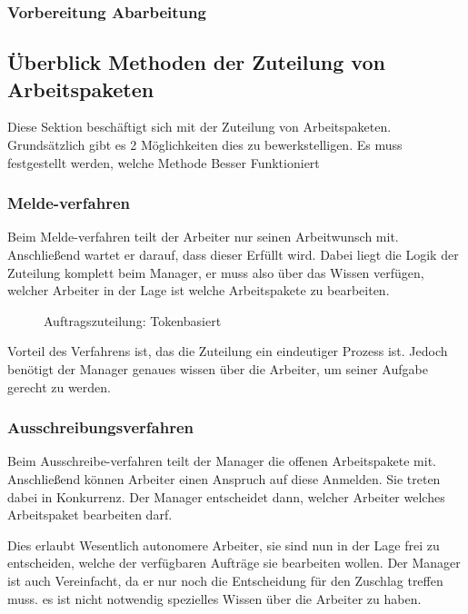 \subsubsection{Vorbereitung Abarbeitung}

\subsection{Überblick Methoden der Zuteilung von Arbeitspaketen}

Diese Sektion beschäftigt sich mit der Zuteilung von Arbeitspaketen.
Grundsätzlich gibt es 2 Möglichkeiten dies zu bewerkstelligen.
Es muss festgestellt werden, welche Methode Besser Funktioniert

\subsubsection{Melde-verfahren}
Beim Melde-verfahren teilt der Arbeiter nur seinen Arbeitwunsch mit.
Anschließend wartet er darauf, dass dieser Erfüllt wird.
Dabei liegt die Logik der Zuteilung komplett beim Manager,
er muss also über das Wissen verfügen, welcher Arbeiter in der Lage ist welche Arbeitspakete zu bearbeiten.

\begin{figure}[ht] 
  \label{fig:auftrag-zuteilung-token}
  \begin{sequencediagram}
  \end{sequencediagram}
  \caption{Auftragszuteilung: Tokenbasiert}
\end{figure}

Vorteil des Verfahrens ist, das die Zuteilung ein eindeutiger Prozess ist.
Jedoch benötigt der Manager genaues wissen über die Arbeiter,
um seiner Aufgabe gerecht zu werden.

\subsubsection{Ausschreibungsverfahren}

Beim Ausschreibe-verfahren teilt der Manager die offenen Arbeitspakete mit.
Anschließend können Arbeiter einen Anspruch auf diese Anmelden.
Sie treten dabei in Konkurrenz.
Der Manager entscheidet dann, welcher Arbeiter welches Arbeitspaket bearbeiten darf.

Dies erlaubt Wesentlich autonomere Arbeiter,
sie sind nun in der Lage frei zu entscheiden,
welche der verfügbaren Aufträge sie bearbeiten wollen.
Der Manager ist auch Vereinfacht,
da er nur noch die Entscheidung für den Zuschlag treffen muss.
es ist nicht notwendig spezielles Wissen über die Arbeiter zu haben. 


